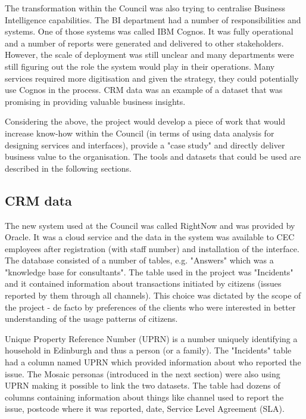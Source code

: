 The transformation within the Council was also trying to centralise Business Intelligence capabilities. The BI department had a number of responsibilities and systems. One of those systems was called IBM Cognos. It was fully operational and a number of reports were generated and delivered to other stakeholders. However, the scale of deployment was still unclear and many departments were still figuring out the role the system would play in their operations. Many services required more digitisation and given the strategy, they could potentially use Cognos in the process. CRM data was an example of a dataset that was promising in providing valuable business insights.

Considering the above, the project would develop a piece of work that would increase know-how within the Council (in terms of using data analysis for designing services and interfaces), provide a "case study" and directly deliver business value to the organisation. The tools and datasets that could be used are described in the following sections.

		\subsection{CRM data}
		
The new system used at the Council was called RightNow and was provided by Oracle. It was a cloud service and the data in the system was available to CEC employees after registration (with staff number) and installation of the interface. The database consisted of a number of tables, e.g. "Answers" which was a "knowledge base for consultants". The table used in the project was "Incidents" and it contained information about transactions initiated by citizens (issues reported by them through all channels). This choice was dictated by the scope of the project - de facto by preferences of the clients who were interested in better understanding of the usage patterns of citizens.

Unique Property Reference Number (UPRN) is a number uniquely identifying a household in Edinburgh and thus a person (or a family). The "Incidents" table had a column named UPRN which provided information about who reported the issue. The Mosaic personas (introduced in the next section) were also using UPRN making it possible to link the two datasets. The table had dozens of columns containing information about things like channel used to report the issue, postcode where it was reported, date, Service Level Agreement (SLA).


